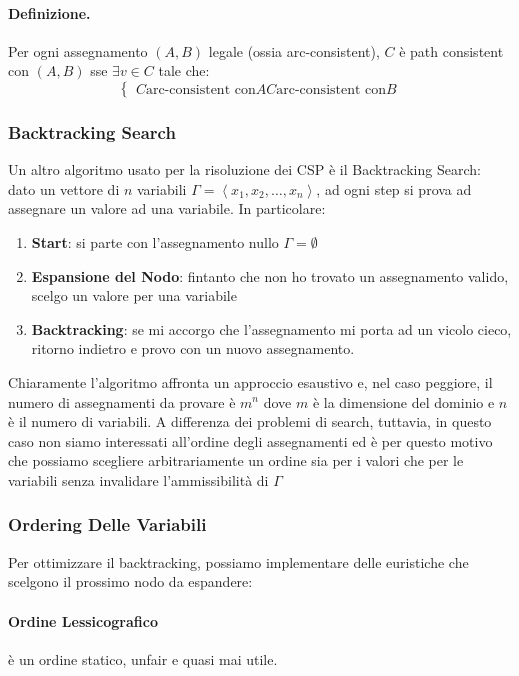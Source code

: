 \paragraph{Definizione.}Per ogni assegnamento $(A,B)$ legale (ossia arc-consistent), $C$ è  path consistent con $(A,B)$ sse
$\exists v \in C$ tale che:
\begin{equation}
    \begin{cases}
        C \text{arc-consistent con} A
        C \text{arc-consistent con} B 
    \end{cases}
\end{equation}

\subsubsection{Backtracking Search}
Un altro algoritmo usato per la risoluzione dei CSP è il Backtracking Search: dato un vettore di $n$ variabili
$\Gamma = \left\langle x_1, x_2, \dots, x_n\right\rangle $, ad ogni step si prova ad assegnare un valore ad una variabile.
In particolare:
\begin{enumerate}
    \item \textbf{Start}: si parte con l'assegnamento nullo $\Gamma = \emptyset$
    \item \textbf{Espansione del Nodo}: fintanto che non ho trovato un assegnamento valido, scelgo un valore per una variabile
    \item \textbf{Backtracking}: se mi accorgo che l'assegnamento mi porta ad un vicolo cieco, ritorno indietro e provo con un nuovo assegnamento.
\end{enumerate}
Chiaramente l'algoritmo affronta un approccio esaustivo e, nel caso peggiore, il numero di assegnamenti da provare è $m^n$ dove
$m$ è la dimensione del dominio e $n$ è il numero di variabili. A differenza dei problemi di search, tuttavia, in questo caso
non siamo interessati all'ordine degli assegnamenti ed è per questo motivo che possiamo scegliere arbitrariamente un ordine sia per i valori
che per le variabili senza invalidare l'ammissibilità di $\Gamma$ 
\subsubsection{Ordering Delle Variabili}
Per ottimizzare il backtracking, possiamo implementare delle euristiche che scelgono il prossimo nodo da espandere:
\paragraph{Ordine Lessicografico}è un ordine statico, unfair e quasi mai utile.
